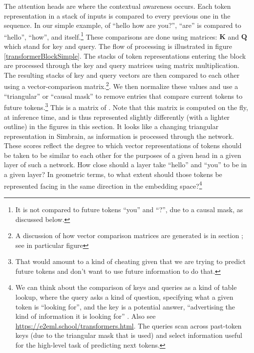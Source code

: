 The attention heads are where the contextual awareness occurs. Each token
representation in a stack of inputs is compared to every previous one in the sequence. In our
simple example, of ``hello how are you?'', ``are'' is compared to ``hello'', ``how'', and itself.\footnote{It is not compared to future tokens ``you'' and ``?'', due to a causal mask, as discussed below.} These comparisons are done using matrices: $\textbf{K}$ and $\textbf{Q}$ which stand for key and query. The flow of processing is illustrated in figure \ref{transformerBlockSimple}. The stacks of token representations entering the block are processed through the key and query matrices using matrix multiplication. The resulting stacks of key and query vectors are then compared to each other using a vector-comparison matrix.\footnote{A discussion of how vector comparison matrices are generated is in section ; see in particular figure }.  We then normalize these values and use a ``triangular'' or ``causal mask'' to remove entries that compare current tokens to future tokens.\footnote{That would amount to a kind of cheating given that we are trying to predict future tokens and don't want to use future information to do that.}  This is a matrix of . Note that this matrix is computed on the fly, at inference time, and is thus represented slightly differently (with a lighter outline) in the figures in this section. It looks like a changing triangular representation in Simbrain, as information is processed through the network. These scores reflect the  degree to which vector representations of tokens should be taken to be similar to each other for the purposes of a given head in a given layer of such a network. How close should a layer take ``hello'' and ``you'' to be in a given layer?  In geometric terms, to what extent should those tokens  be represented facing in the same direction in the embedding space?\footnote{We can think about the comparison of keys and queries as a kind of table lookup, where the query asks a kind of question, specifying what a given token is ``looking for'', and the key is a potential answer, ``advertising the kind of information it is looking for'' \cite{beckmann2025mechanistic}. Also see \url{https://e2eml.school/transformers.html}. The queries scan across past-token keys (due to the triangular mask that is used) and select information useful for the high-level task of predicting next tokens.} 


